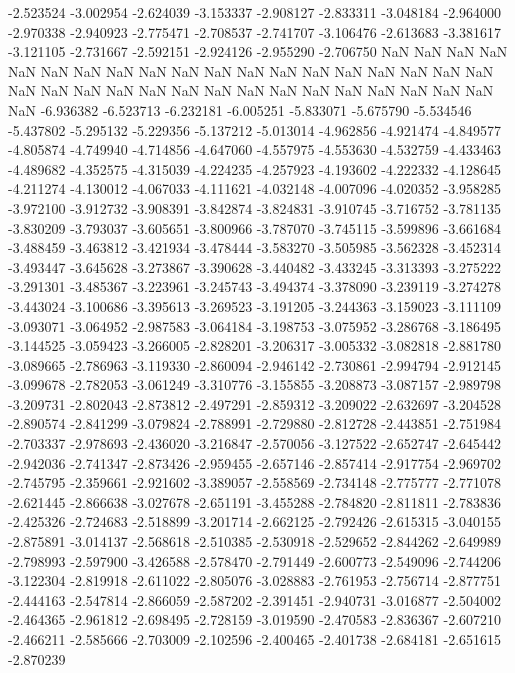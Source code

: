 -2.523524
-3.002954
-2.624039
-3.153337
-2.908127
-2.833311
-3.048184
-2.964000
-2.970338
-2.940923
-2.775471
-2.708537
-2.741707
-3.106476
-2.613683
-3.381617
-3.121105
-2.731667
-2.592151
-2.924126
-2.955290
-2.706750
NaN
NaN
NaN
NaN
NaN
NaN
NaN
NaN
NaN
NaN
NaN
NaN
NaN
NaN
NaN
NaN
NaN
NaN
NaN
NaN
NaN
NaN
NaN
NaN
NaN
NaN
NaN
NaN
NaN
NaN
NaN
NaN
NaN
NaN
NaN
-6.936382
-6.523713
-6.232181
-6.005251
-5.833071
-5.675790
-5.534546
-5.437802
-5.295132
-5.229356
-5.137212
-5.013014
-4.962856
-4.921474
-4.849577
-4.805874
-4.749940
-4.714856
-4.647060
-4.557975
-4.553630
-4.532759
-4.433463
-4.489682
-4.352575
-4.315039
-4.224235
-4.257923
-4.193602
-4.222332
-4.128645
-4.211274
-4.130012
-4.067033
-4.111621
-4.032148
-4.007096
-4.020352
-3.958285
-3.972100
-3.912732
-3.908391
-3.842874
-3.824831
-3.910745
-3.716752
-3.781135
-3.830209
-3.793037
-3.605651
-3.800966
-3.787070
-3.745115
-3.599896
-3.661684
-3.488459
-3.463812
-3.421934
-3.478444
-3.583270
-3.505985
-3.562328
-3.452314
-3.493447
-3.645628
-3.273867
-3.390628
-3.440482
-3.433245
-3.313393
-3.275222
-3.291301
-3.485367
-3.223961
-3.245743
-3.494374
-3.378090
-3.239119
-3.274278
-3.443024
-3.100686
-3.395613
-3.269523
-3.191205
-3.244363
-3.159023
-3.111109
-3.093071
-3.064952
-2.987583
-3.064184
-3.198753
-3.075952
-3.286768
-3.186495
-3.144525
-3.059423
-3.266005
-2.828201
-3.206317
-3.005332
-3.082818
-2.881780
-3.089665
-2.786963
-3.119330
-2.860094
-2.946142
-2.730861
-2.994794
-2.912145
-3.099678
-2.782053
-3.061249
-3.310776
-3.155855
-3.208873
-3.087157
-2.989798
-3.209731
-2.802043
-2.873812
-2.497291
-2.859312
-3.209022
-2.632697
-3.204528
-2.890574
-2.841299
-3.079824
-2.788991
-2.729880
-2.812728
-2.443851
-2.751984
-2.703337
-2.978693
-2.436020
-3.216847
-2.570056
-3.127522
-2.652747
-2.645442
-2.942036
-2.741347
-2.873426
-2.959455
-2.657146
-2.857414
-2.917754
-2.969702
-2.745795
-2.359661
-2.921602
-3.389057
-2.558569
-2.734148
-2.775777
-2.771078
-2.621445
-2.866638
-3.027678
-2.651191
-3.455288
-2.784820
-2.811811
-2.783836
-2.425326
-2.724683
-2.518899
-3.201714
-2.662125
-2.792426
-2.615315
-3.040155
-2.875891
-3.014137
-2.568618
-2.510385
-2.530918
-2.529652
-2.844262
-2.649989
-2.798993
-2.597900
-3.426588
-2.578470
-2.791449
-2.600773
-2.549096
-2.744206
-3.122304
-2.819918
-2.611022
-2.805076
-3.028883
-2.761953
-2.756714
-2.877751
-2.444163
-2.547814
-2.866059
-2.587202
-2.391451
-2.940731
-3.016877
-2.504002
-2.464365
-2.961812
-2.698495
-2.728159
-3.019590
-2.470583
-2.836367
-2.607210
-2.466211
-2.585666
-2.703009
-2.102596
-2.400465
-2.401738
-2.684181
-2.651615
-2.870239
